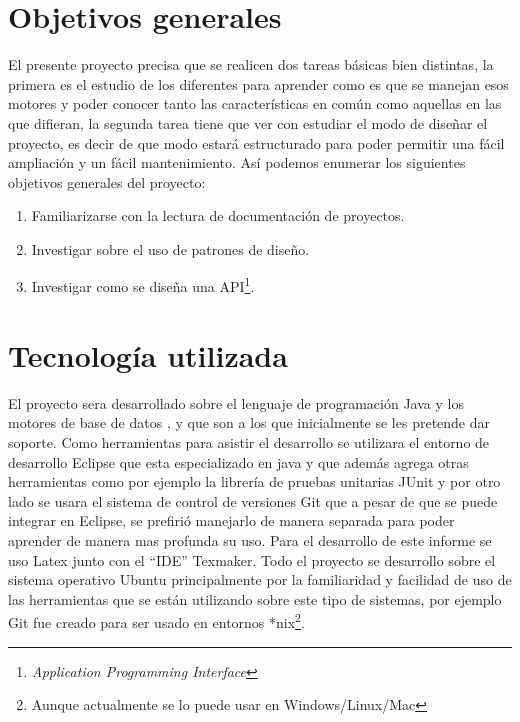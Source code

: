 \section{Objetivos generales}
El presente proyecto precisa que se realicen dos tareas básicas bien distintas, la primera es el estudio de los diferentes \dd para aprender como es que se manejan esos motores y poder conocer tanto las características en común como aquellas en las que difieran, la segunda tarea tiene que ver con estudiar el modo de diseñar el proyecto, es decir de que modo estará estructurado \jj para poder permitir una fácil ampliación y un fácil mantenimiento. Así podemos enumerar los siguientes objetivos generales del proyecto:
\begin{enumerate}
\item Familiarizarse con la lectura de documentación de proyectos.
\item Investigar sobre el uso de patrones de diseño.
\item Investigar como se diseña una API\footnote{\textit{Application Programming Interface}}.
\end{enumerate}
%
\section{Tecnología utilizada}
El proyecto sera desarrollado sobre el lenguaje de programación Java y los motores de base de datos \m, \p y \s que son a los que inicialmente se les pretende dar soporte. Como herramientas para asistir el desarrollo se utilizara el entorno de desarrollo Eclipse que esta especializado en java y que además agrega otras herramientas como por ejemplo la librería de pruebas unitarias JUnit y por otro lado se usara el sistema de control de versiones Git que a pesar de que se puede integrar en Eclipse, se prefirió manejarlo de manera separada para poder aprender de manera mas profunda su uso. Para el desarrollo de este informe se uso Latex junto con el ``IDE'' Texmaker. Todo el proyecto se desarrollo sobre el sistema operativo Ubuntu principalmente por la familiaridad y facilidad de uso de las herramientas que se están utilizando sobre este tipo de sistemas, por ejemplo Git fue creado para ser usado en entornos *nix\footnote{Aunque actualmente se lo puede usar en Windows/Linux/Mac}.
%
%
%
%
